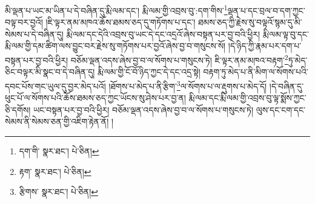 མི་ལྡན་པ་ཡང་མ་ཡིན་པ་དེ་བཞིན་དུ་རྨི་ལམ་དང་། རྨི་ལམ་གྱི་འབྲས་བུ་:དག་གིས་\footnote{དག་གི་  སྣར་ཐང་།  པེ་ཅིན། }ལྡན་པ་དང་བྲལ་བ་དག་ཀྱང་བལྟ་བར་བྱའོ། །ཇི་ལྟར་ནམ་མཁའ་ཆོས་ཐམས་ཅད་དུ་གཏོགས་པ་དང་། ཐམས་ཅད་ཀྱི་རྗེས་སུ་བལྟའོ་སྙམ་དུ་མི་སེམས་པ་དེ་བཞིན་དུ། རྨི་ལམ་དང་དེའི་འབྲས་བུ་ཡང་དེ་དང་འདྲའོ་ཞེས་བསྟན་པར་བྱ་བའི་ཕྱིར། རྨི་ལམ་ལྟ་བུ་དང་རྨི་ལམ་གྱི་དམ་ཚིག་ལས་བྱུང་བར་རྗེས་སུ་གཏོགས་པར་བྱའོ་ཞེས་བྱ་བ་གསུངས་སོ། །དེ་ཉིད་ཀྱི་རྣམ་པར་དག་པ་བསྟན་པར་བྱ་བའི་ཕྱིར། བཅོམ་ལྡན་འདས་ཞེས་བྱ་བ་ལ་སོགས་པ་གསུངས་ཏེ། ཇི་ལྟར་ནམ་མཁའ་བརྟག་\footnote{རྟག་  སྣར་ཐང་།  པེ་ཅིན། }ཏུ་མེད་ཅིང་བལྟར་མི་སྣང་བ་དེ་བཞིན་དུ། རྨི་ལམ་གྱི་ངོ་བོ་ཉིད་ཀྱང་དེ་དང་འདྲ་སྟེ། བརྟག་ཏུ་མེད་པ་ནི་མིག་ལ་སོགས་པའི་དབང་པོས་གང་ཡུལ་དུ་བྱར་མེད་པའོ། །ཐོགས་པ་མེད་པ་ནི་རྩིག་\footnote{རྩིགས་  སྣར་ཐང་།  པེ་ཅིན། }ལ་སོགས་པ་ལ་རྡུགས་པ་མེད་དོ། །དེ་བཞིན་དུ་ཕུང་པོ་ལ་སོགས་པའི་ཆོས་ཐམས་ཅད་ཀྱང་ཡོངས་སུ་ཤེས་པར་བྱ་ན། རྨི་ལམ་དང་རྨི་ལམ་གྱི་འབྲས་བུ་ལྟ་སྨོས་ཀྱང་ཅི་དགོས། ཡང་བསྟན་པར་བྱ་བའི་ཕྱིར། བཅོམ་ལྡན་འདས་ཞེས་བྱ་བ་ལ་སོགས་པ་གསུངས་ཏེ། ལུས་དང་ངག་དང་སེམས་ནི་སེམས་ཅན་གྱི་འཇིག་རྟེན་ནོ། །
